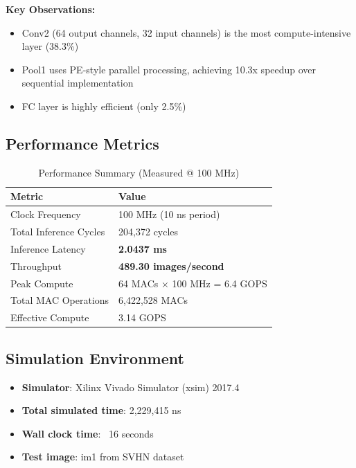 \documentclass[11pt,a4paper]{article}
\begin{document}
\noindent \textbf{Key Observations:}
\begin{itemize}
    \item Conv2 (64 output channels, 32 input channels) is the most compute-intensive layer (38.3\%)
    \item Pool1 uses PE-style parallel processing, achieving 10.3x speedup over sequential implementation
    \item FC layer is highly efficient (only 2.5\%)
\end{itemize}

\subsection{Performance Metrics}

\begin{table}[H]
\centering
\caption{Performance Summary (Measured @ 100 MHz)}
\begin{tabular}{ll}
\toprule
\textbf{Metric} & \textbf{Value} \\
\midrule
Clock Frequency & 100 MHz (10 ns period) \\
Total Inference Cycles & 204,372 cycles \\
Inference Latency & \textbf{2.0437 ms} \\
Throughput & \textbf{489.30 images/second} \\
Peak Compute & 64 MACs × 100 MHz = 6.4 GOPS \\
Total MAC Operations & 6,422,528 MACs \\
Effective Compute & 3.14 GOPS \\
\bottomrule
\end{tabular}
\end{table}

\subsection{Simulation Environment}
\begin{itemize}
    \item \textbf{Simulator}: Xilinx Vivado Simulator (xsim) 2017.4
    \item \textbf{Total simulated time}: 2,229,415 ns
    \item \textbf{Wall clock time}: ~16 seconds
    \item \textbf{Test image}: im1 from SVHN dataset
\end{itemize}

\end{document}
